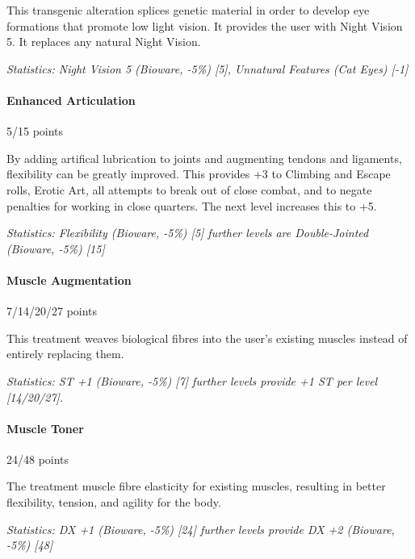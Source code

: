 \begin{multicols*}{3}
	This transgenic alteration splices genetic material in order to develop eye formations that promote low light vision. It provides the user with Night Vision 5. It replaces any natural Night Vision.
	
	\textit{\textcolor{OliveGreen}{Statistics: Night Vision 5 (Bioware, -5\%) [5], Unnatural Features (Cat Eyes) [-1]}}
	
	\paragraph{Enhanced Articulation}
	\begin{flushright}
		5/15 points
	\end{flushright}
	
	By adding artifical lubrication to joints and augmenting tendons and ligaments, flexibility can be greatly improved. This provides +3 to Climbing and Escape rolls, Erotic Art, all attempts to break out of close combat, and to negate penalties for working in close quarters. The next level increases this to +5.
	
	\textit{\textcolor{OliveGreen}{Statistics: Flexibility (Bioware, -5\%) [5] further levels are Double-Jointed (Bioware, -5\%) [15]}}
	
	\paragraph{Muscle Augmentation}
	\begin{flushright}
		7/14/20/27 points
	\end{flushright}
	
	This treatment weaves biological fibres into the user's existing muscles instead of entirely replacing them.
	
	\textit{\textcolor{OliveGreen}{Statistics: ST +1 (Bioware, -5\%) [7] further levels provide +1 ST per level [14/20/27].}}
	
	\paragraph{Muscle Toner}
	\begin{flushright}
		24/48 points
	\end{flushright}
	
	The treatment muscle fibre elasticity for existing muscles, resulting in better flexibility, tension, and agility for the body.
	
	\textit{\textcolor{OliveGreen}{Statistics: DX +1 (Bioware, -5\%) [24] further levels provide DX +2 (Bioware, -5\%) [48]}}
	

\end{multicols*}
